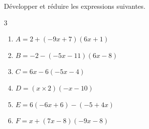 {%
\begin{Exercice}%
Développer et réduire les expressions suivantes.
\vspace{-0.5cm}
\begin{multicols}{3}
\begin{enumerate}[itemsep=2em,label={}]
	\item \begin{minipage}[t]{\linewidth}$A=2+(-9x+7)(6x+1)$\end{minipage}
	\item \begin{minipage}[t]{\linewidth}$B=-2-(-5x-11)(6x-8)$\end{minipage}
	\item \begin{minipage}[t]{\linewidth}$C=6x-6(-5x-4)$\end{minipage}
	\item \begin{minipage}[t]{\linewidth}$D=(x\times2)(-x-10)$\end{minipage}
	\item \begin{minipage}[t]{\linewidth}$E=6(-6x+6)-(-5+4x)$\end{minipage}
	\item \begin{minipage}[t]{\linewidth}$F=x+(7x-8)(-9x-8)$\end{minipage}
\end{enumerate}
\end{multicols}
\end{Exercice}

}
